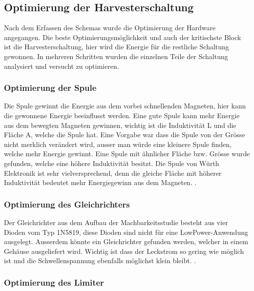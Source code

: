 \subsection{Optimierung der Harvesterschaltung}

Nach dem Erfassen des Schemas wurde die Optimierung der Hardware angegangen. Die beste Optimierungsmöglichkeit und auch der kritischste Block ist die Harvesterschaltung, hier wird die Energie für die restliche Schaltung gewonnen. In mehreren Schritten wurden die einzelnen Teile der Schaltung analysiert und versucht zu optimieren.

\subsubsection{Optimierung der Spule}

Die Spule gewinnt die Energie aus dem vorbei schnellenden Magneten, hier kann die gewonnene Energie beeinflusst werden. Eine gute Spule kann mehr Energie aus dem bewegten Magneten gewinnen, wichtig ist die Induktivität L und die Fläche A, welche die Spule hat. Eine Vorgabe war dass die Spule von der Grösse nicht merklich verändert wird, ausser man würde eine kleinere Spule finden, welche mehr Energie gewinnt. Eine Spule mit ähnlicher Fläche bzw. Grösse wurde gefunden, welche eine höhere Induktivität besitzt. Die Spule von Würth Elektronik ist sehr vielversprechend, denn die gleiche Fläche mit höherer Induktivität bedeutet mehr Energiegewinn aus dem Magneten.
.

\subsubsection{Optimierung des Gleichrichters}

Der Gleichrichter aus dem Aufbau der Machbarkeitsstudie besteht aus vier Dioden vom Typ 1N5819, diese Dioden sind nicht für eine LowPower-Anwendung ausgelegt. Ausserdem könnte ein Gleichrichter gefunden werden, welcher in einem Gehäuse ausgeliefert wird. Wichtig ist dass der Leckstrom so gering wie möglich ist und die Schwellenspannung ebenfalls möglichst klein bleibt. 
.

\subsubsection{Optimierung des Limiter}


